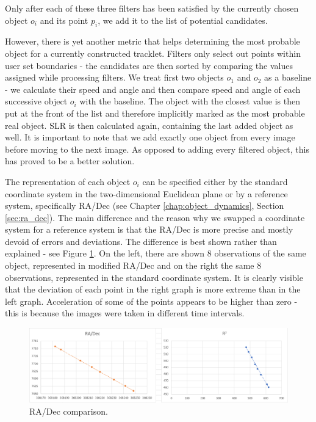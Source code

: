 	Only after each of these three filters has been satisfied by the currently chosen object $o_i$ and its point $p_i$, we add it to the list of potential candidates. 
	
	However, there is yet another metric that helps determining the most probable object for a currently constructed tracklet. Filters only select out points within user set boundaries - the candidates are then sorted by comparing the values assigned while processing filters. We treat first two objects $o_1$ and $o_2$ as a baseline - we calculate their speed and angle and then compare speed and angle of each successive object $o_i$ with the baseline. The object with the closest value is then put at the front of the list and therefore implicitly marked as the most probable real object. SLR is then calculated again, containing the last added object as well. It is important to note that we add exactly one object from every image before moving to the next image. As opposed to adding every filtered object, this has proved to be a better solution.
	
	The representation of each object $o_i$ can be specified either by the standard coordinate system in the two-dimensional Euclidean plane or by a reference system, specifically RA/Dec (see Chapter \ref{chap:object_dynamics}, Section \ref{sec:ra_dec}). The main difference and the reason why we swapped a coordinate system for a reference system is that the RA/Dec is more precise and mostly devoid of errors and deviations. The difference is best shown rather than explained - see Figure \ref{fig:regresia3}. On the left, there are shown 8 observations of the same object, represented in modified RA/Dec and on the right the same 8 observations, represented in the standard coordinate system. It is clearly visible that the deviation of each point in the right graph is more extreme than in the left graph. Acceleration of some of the points appears to be higher than zero - this is because the images were taken in different time intervals.
	
	\begin{figure}[H]
	\centering
	  \includegraphics[width=\linewidth]{images/regresia3}
		  \caption{RA/Dec comparison.}
	  \label{fig:regresia3}
	\end{figure}
	
